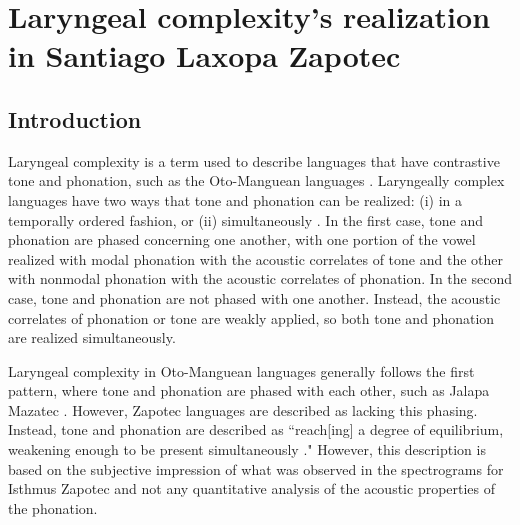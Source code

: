 \chapter{Laryngeal complexity's realization in Santiago Laxopa Zapotec} \label{ch:testing_lc}

\section{Introduction}\label{sec:introduction_of_lc}
Laryngeal complexity is a term used to describe languages that have contrastive tone and phonation, such as the Oto-Manguean languages \citep{blankenshipTimeCourseBreathiness1997,blankenshipTimingNonmodalPhonation2002,silvermanLaryngealComplexityOtomanguean1997,silvermanPhasingRecoverability1997}. Laryngeally complex languages have two ways that tone and phonation can be realized: (i) in a temporally ordered fashion, or (ii) simultaneously \citep{silvermanLaryngealComplexityOtomanguean1997}. In the first case, tone and phonation are phased concerning one another, with one portion of the vowel realized with modal phonation with the acoustic correlates of tone and the other with nonmodal phonation with the acoustic correlates of phonation. In the second case, tone and phonation are not phased with one another. Instead, the acoustic correlates of phonation or tone are weakly applied, so both tone and phonation are realized simultaneously.

Laryngeal complexity in Oto-Manguean languages generally follows the first pattern, where tone and phonation are phased with each other, such as Jalapa Mazatec \citep{blankenshipTimeCourseBreathiness1997,blankenshipTimingNonmodalPhonation2002,silvermanLaryngealComplexityOtomanguean1997,silvermanPhasingRecoverability1997}. However, Zapotec languages are described as lacking this phasing. Instead, tone and phonation are described as ``reach[ing] a degree of equilibrium, weakening enough to be present simultaneously \citep[558]{herrerazendejasAmuzgoZapotecTwo2000}." However, this description is based on the subjective impression of what was observed in the spectrograms for Isthmus Zapotec and not any quantitative analysis of the acoustic properties of the phonation.  

